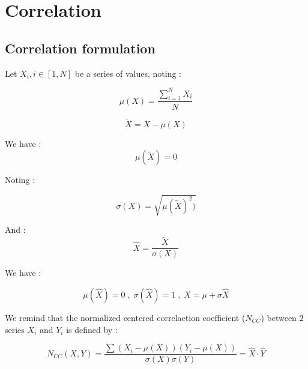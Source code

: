 
\section{Correlation}

\subsection{Correlation formulation}


Let $X_i, i \in [1,N] $ be a series of values, noting :

\begin{equation}
     \mu(X) = \frac{\sum_{i=1}^N  X_i}{N}
\end{equation}

\begin{equation}
     \widetilde{X} = X - \mu(X)
\end{equation}

We have : 
\begin{equation}
     \mu(\widetilde{X}) = 0
\end{equation}

Noting :

\begin{equation}
     \sigma(X) =   \sqrt{\mu(\widetilde{X})^2)   }
\end{equation}

And  :
\begin{equation}
     \widehat {X} =   \frac{\widetilde{X}}{\sigma(X)}
\end{equation}

We have :

\begin{equation}
     \mu(\widehat {X}) =0    \; , \; \sigma(\widehat {X}) = 1  \; , \;  X = \mu + \sigma \widehat {X}
\end{equation}


We remind that the normalized centered correlaction coefficient ($N_{CC}$)  between $2$ series $X_i$ and $Y_i$ is defined by :

\begin{equation}
    N_{CC}(X,Y) = \frac{\sum (X_i-\mu(X)) (Y_i-\mu(X)) }{\sigma(X)\sigma(Y)}   = \widehat {X} \cdot \widehat {Y}
\end{equation}








